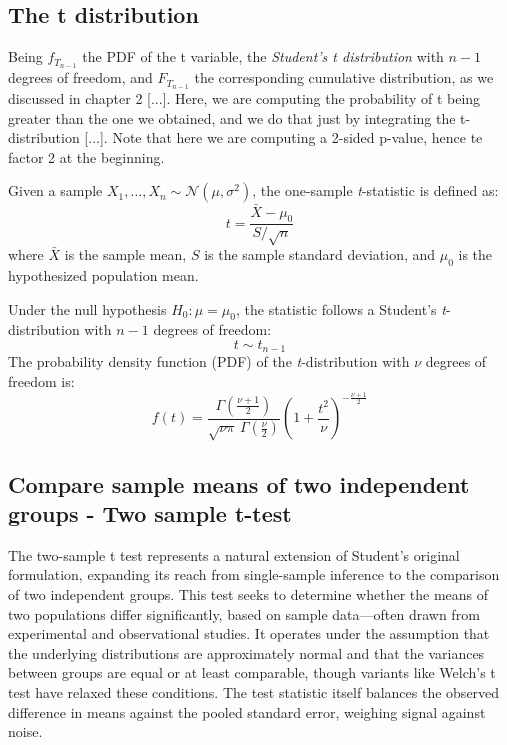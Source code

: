 \documentclass{book}
\begin{document}
\subsection*{The t distribution}

Being $f_{T_{n-1}}$ the PDF of the t variable, the \textit{Student's t distribution} with $n - 1$ degrees of freedom, and $F_{T_{n-1}}$ the corresponding cumulative distribution, as we discussed in chapter 2 [...]. Here, we are computing the probability of t being greater than the one we obtained, and we do that just by integrating the t-distribution [...]. Note that here we are computing a 2-sided p-value, hence te factor 2 at the beginning. 

Given a sample \( X_1, \ldots, X_n \sim \mathcal{N}(\mu, \sigma^2) \), the one-sample \textit{t}-statistic is defined as:
\[
t = \frac{\bar{X} - \mu_0}{S / \sqrt{n}}
\]
where \( \bar{X} \) is the sample mean, \( S \) is the sample standard deviation, and \( \mu_0 \) is the hypothesized population mean.

Under the null hypothesis \( H_0: \mu = \mu_0 \), the statistic follows a Student's \textit{t}-distribution with \( n-1 \) degrees of freedom:
\[
t \sim t_{n-1}
\]
The probability density function (PDF) of the \textit{t}-distribution with \( \nu \) degrees of freedom is:
\[
f(t) = \frac{\Gamma\left(\frac{\nu+1}{2}\right)}{\sqrt{\nu \pi} \, \Gamma\left(\frac{\nu}{2}\right)} \left(1 + \frac{t^2}{\nu}\right)^{-\frac{\nu+1}{2}}
\]

\cite{student1908}

\newpage

\subsection{Compare sample means of two independent groups - Two sample t-test}

The two-sample t test represents a natural extension of Student’s original formulation, expanding its reach from single-sample inference to the comparison of two independent groups. This test seeks to determine whether the means of two populations differ significantly, based on sample data—often drawn from experimental and observational studies. It operates under the assumption that the underlying distributions are approximately normal and that the variances between groups are equal or at least comparable, though variants like Welch’s t test have relaxed these conditions. The test statistic itself balances the observed difference in means against the pooled standard error, weighing signal against noise.\\
\end{document}
